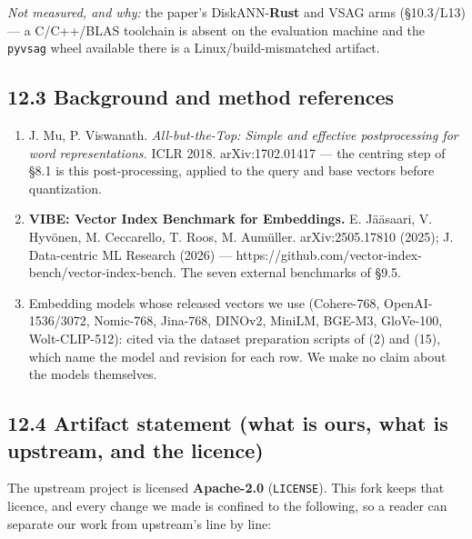 \documentclass[
  10pt,
]{article}
\providecommand{\tightlist}{%
  \setlength{\itemsep}{0pt}\setlength{\parskip}{0pt}}
\begin{document}
\emph{Not measured, and why:} the paper's DiskANN-\textbf{Rust} and VSAG
arms (§10.3/L13) --- a C/C++/BLAS toolchain is absent on the evaluation
machine and the \texttt{pyvsag} wheel available there is a
Linux/build-mismatched artifact.

\subsection{12.3 Background and method
references}\label{background-and-method-references}

\begin{enumerate}
\def\labelenumi{\arabic{enumi}.}
\setcounter{enumi}{13}
\tightlist
\item
  J. Mu, P. Viswanath. \emph{All-but-the-Top: Simple and effective
  postprocessing for word representations.} ICLR 2018. arXiv:1702.01417
  --- the centring step of §8.1 is this post-processing, applied to the
  query and base vectors before quantization.
\item
  \textbf{VIBE: Vector Index Benchmark for Embeddings.} E. Jääsaari, V.
  Hyvönen, M. Ceccarello, T. Roos, M. Aumüller. arXiv:2505.17810 (2025);
  J. Data-centric ML Research (2026) ---
  https://github.com/vector-index-bench/vector-index-bench. The seven
  external benchmarks of §9.5.
\item
  Embedding models whose released vectors we use (Cohere-768,
  OpenAI-1536/3072, Nomic-768, Jina-768, DINOv2, MiniLM, BGE-M3,
  GloVe-100, Wolt-CLIP-512): cited via the dataset preparation scripts
  of (2) and (15), which name the model and revision for each row. We
  make no claim about the models themselves.
\end{enumerate}

\subsection{12.4 Artifact statement (what is ours, what is upstream, and
the
licence)}\label{artifact-statement-what-is-ours-what-is-upstream-and-the-licence}

The upstream project is licensed \textbf{Apache-2.0} (\texttt{LICENSE}).
This fork keeps that licence, and every change we made is confined to
the following, so a reader can separate our work from upstream's line by
line:
\end{document}
